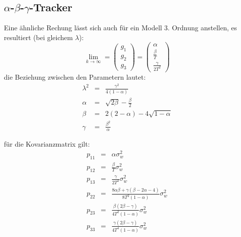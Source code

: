 \subsection{$\alpha$-$\beta$-$\gamma$-Tracker}
Eine ähnliche Rechung lässt sich auch für ein Modell 3. Ordnung anstellen, es resultiert (bei gleichem $\lambda$):
\begin{equation*}
    \lim_{k \to \infty} =
        \begin{pmatrix}
            g_1 \\ g_2 \\ g_3
        \end{pmatrix} =
        \begin{pmatrix}
            \alpha \\ \frac{\beta}{T} \\ \frac{\gamma}{2 T^2}
        \end{pmatrix}
\end{equation*}
die Beziehung zwischen den Parametern lautet:
\begin{eqnarray*}
    \lambda^2 &=& \frac{\gamma^2}{4 (1-\alpha)} \\
    \alpha &=& \sqrt{2 \beta} - \frac{\beta}{2} \\
    \beta &=& 2(2-\alpha) - 4 \sqrt{1-\alpha} \\
    \gamma &=& \frac{\beta^2}{\alpha}
\end{eqnarray*}

für die Kovarianzmatrix gilt:
\begin{eqnarray*}
    p_{11} &=& \alpha \sigma_w^2 \\
    p_{12} &=& \frac{\beta}{T} \sigma_w^2 \\
    p_{13} &=& \frac{\gamma}{2T^2} \sigma_w^2 \\
    p_{22} &=& \frac{8 \alpha \beta + \gamma (\beta - 2 \alpha -4)}{8 T^2 (1-\alpha)} \sigma_w^2 \\
    p_{23} &=& \frac{\beta (2\beta - \gamma)}{4 T^2 (1- \alpha)} \sigma_w^2 \\
    p_{33} &=& \frac{\gamma (2 \beta - \gamma)}{4 T^4 (1-\alpha)} \sigma_w^2
\end{eqnarray*}

